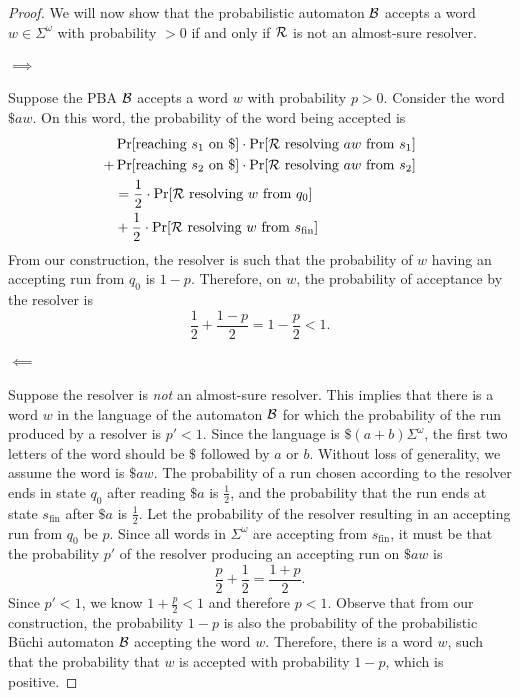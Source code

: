 \begin{proof}
We will now show that the probabilistic automaton $\mathcal{B}$ accepts a word  $w\in \Sigma^\omega$ with probability $>0$ if and only if 
$\mathcal{R}$ is not an almost-sure resolver. 

\paragraph*{$\implies$} Suppose the PBA $\mathcal{B}$ accepts a word $w$ with probability $p>0$. 
Consider the word $ \$ a w$. On this word, the probability of the word being accepted is 
\begin{equation*} %
\begin{split}
&\Pr[\text{reaching }s_1\text{ on } \$]\cdot \Pr[\Rc\text{ resolving } aw \text{ from }s_1] \\
        +  
    &\Pr[\text{reaching }s_2\text{ on } \$] \cdot \Pr[\Rc\text{ resolving } aw \text{ from }s_2] \\
    &= \frac{1}{2}\cdot\Pr[\Rc\text{ resolving } w \text{ from }q_0]\\
    &+ \frac{1}{2}\cdot\Pr[\Rc\text{ resolving } w \text{ from }s_{\text{fin}}]
\end{split}
\end{equation*}
From our construction, the resolver is such that the probability of $w$ having an accepting run from $q_0$ is $1-p$. Therefore, on $w$, the probability of acceptance by the resolver is $$\frac{1}{2} + \frac{1-p}{2} = 1-\frac{p}{2}<1.$$
\paragraph*{$\impliedby$} 
Suppose the resolver is \emph{not} an almost-sure resolver. This implies that there is a word $w$ in the language of the automaton $\mathcal{B}$ for which the probability of the run produced by a resolver is $p'<1$. Since the language is $\$(a+b)\Sigma^\omega$, the first two letters of the word should be $\$$ followed by $a$ or $b$. Without loss of generality, we assume the word is $\$aw$. 
The probability of a run chosen according to the resolver ends in state $q_0$ after reading $\$ a$ is $\frac{1}{2}$, and the probability that the run ends at state $s_{\text{fin}}$ after $\$ a$ is $\frac{1}{2}$. Let the probability of the resolver resulting in an accepting run from $q_0$ be $p$. Since all words in $\Sigma^\omega$ are accepting from $s_{\text{fin}}$, it must be that the probability $p'$ of the resolver producing an accepting run on $\$aw$ is $$\frac{p}{2} + \frac{1}{2} = \frac{1+p}{2}.$$
Since $p'<1$, we know $1+\frac{p}{2}<1$ and therefore $p<1$. Observe that from our construction, the probability $1-p$ is also the probability of the probabilistic B\"uchi automaton $\mathcal{B}$ accepting the word $w$. Therefore, there is a word $w$, such that the probability that $w$ is accepted with probability $1-p$, which is positive. 
\end{proof}
\lemmaUndecidableBuchi*

